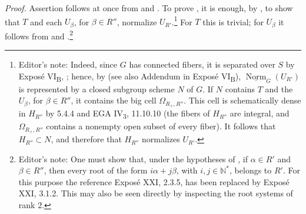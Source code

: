 \textit{Proof.}
Assertion \textup{} follows at once from  and
\textup{}. To prove \textup{}, it is enough, by ,
to show that \(T\) and each \(U_\beta\), for \(\beta\in R''\),
normalize \(U_{R'}\).\footnote{Editor's note: Indeed, since \(G\)
has connected fibers, it is separated over \(S\) by Exposé
VI\textsubscript{B}, ; hence, by  \textup{(see
also Addendum  in Exposé VI\textsubscript{B})},
\(\underline{\operatorname{Norm}}_G(U_{R'})\) is represented by a
closed subgroup scheme \(N\) of \(G\). If \(N\) contains \(T\) and
the \(U_\beta\), for \(\beta\in R''\), it contains the big cell
\(\Omega_{R_+,R''}\). This cell is schematically dense in
\(H_{R''}\) by 5.4.4 and EGA IV\textsubscript{3}, 11.10.10
\textup{(the fibers of \(H_{R''}\) are integral, and
\(\Omega_{R_+,R''}\) contains a nonempty open subset of every
fiber)}. It follows that \(H_{R''}\subset N\), and therefore that
\(H_{R''}\) normalizes \(U_{R'}\).}
For \(T\) this is trivial; for \(U_\beta\) it follows from  and
.\footnote{Editor's note: One must show that, under
the hypotheses of \textup{}, if \(\alpha\in R'\) and
\(\beta\in R''\), then every root of the form \(i\alpha+j\beta\),
with \(i,j\in\mathbb N^\ast\), belongs to \(R'\). For this purpose
the reference Exposé XXI, 2.3.5, has been replaced by Exposé XXI,
3.1.2. This may also be seen directly by inspecting the root systems
of rank \(2\).}

